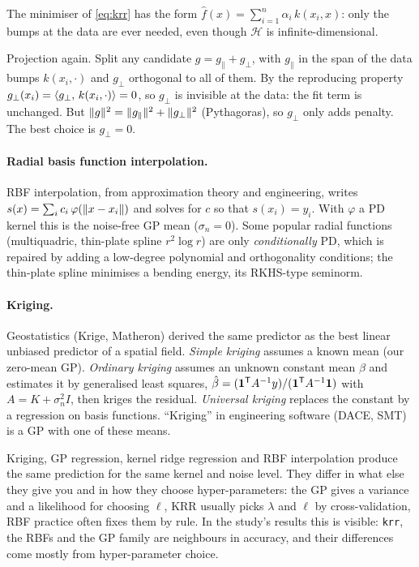 \begin{result}
The minimiser of \eqref{eq:krr} has the form $\hat f(x) = \sum_{i=1}^n \alpha_i\, k(x_i, x)$: only the bumps at the
data are ever needed, even though $\mathcal{H}$ is infinite-dimensional.
\end{result}
\begin{intuition}
Projection again. Split any candidate $g = g_\parallel + g_\perp$, with $g_\parallel$ in the span of the data bumps
$k(x_i,\cdot)$ and $g_\perp$ orthogonal to all of them. By the reproducing property
$g_\perp(x_i) = \langle g_\perp,\, k(x_i,\cdot)\rangle = 0$, so $g_\perp$ is invisible at the data: the fit term is unchanged.
But $\lVert g\rVert^2 = \lVert g_\parallel\rVert^2 + \lVert g_\perp\rVert^2$ (Pythagoras), so $g_\perp$ only adds penalty. The best
choice is $g_\perp = 0$.
\end{intuition}

\paragraph{Radial basis function interpolation.} RBF interpolation, from approximation theory and engineering,
writes $s(x) = \sum_i c_i\, \varphi(\lVert x - x_i\rVert)$ and solves for $c$ so that $s(x_i) = y_i$. With $\varphi$ a
PD kernel this is the noise-free GP mean ($\sigma_n = 0$). Some popular radial functions (multiquadric, thin-plate
spline $r^2\log r$) are only \emph{conditionally} PD, which is repaired by adding a low-degree polynomial and
orthogonality conditions; the thin-plate spline minimises a bending energy, its RKHS-type seminorm.

\paragraph{Kriging.} Geostatistics (Krige, Matheron) derived the same predictor as the best linear unbiased predictor
of a spatial field. \emph{Simple kriging} assumes a known mean (our zero-mean GP). \emph{Ordinary kriging} assumes an
unknown constant mean $\beta$ and estimates it by generalised least squares, $\hat\beta = (\mathbf{1}^{\mathsf{T}} A^{-1}y) /
(\mathbf{1}^{\mathsf{T}} A^{-1}\mathbf{1})$ with $A = K + \sigma_n^2 I$, then kriges the residual. \emph{Universal kriging}
replaces the constant by a regression on basis functions. ``Kriging'' in engineering software (DACE, SMT) is a GP
with one of these means.

\begin{intuition}
Kriging, GP regression, kernel ridge regression and RBF interpolation produce the same prediction for the same
kernel and noise level. They differ in what else they give you and in how they choose hyper-parameters: the GP gives
a variance and a likelihood for choosing $\ell$, KRR usually picks $\lambda$ and $\ell$ by cross-validation, RBF
practice often fixes them by rule. In the study's results this is visible: \texttt{krr}, the RBFs and the GP family
are neighbours in accuracy, and their differences come mostly from hyper-parameter choice.
\end{intuition}

